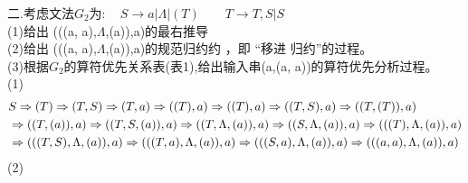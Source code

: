 \documentclass{article}
\begin{document}
\noindent
二.考虑文法$G_{2}为:\quad S \rightarrow a|\Lambda |(T)  \qquad T \rightarrow T,S|S $\\
(1)给出 (((a, a),$\Lambda$,(a)),a)的最右推导\\
(2)给出 (((a, a),$\Lambda$,(a)),a)的规范归约约 ，即 “移进 归约”的过程。\\
(3)根据$G_{2}$的算符优先关系表(表1),给出输入串(a,(a, a))的算符优先分析过程。\\
(1)\vspace{-1cm}
\begin{align*}
    \setlength{\abovedisplayskip}{0pt}
    \setlength{\belowdisplayskip}{3pt}
     & S \Rightarrow (T) \Rightarrow (T,S) \Rightarrow (T,a) \Rightarrow ((T),a) \Rightarrow ((T),a) \Rightarrow ((T,S),a) \Rightarrow ((T,(T)),a)        \\
     & \Rightarrow ((T,(a)),a) \Rightarrow ((T,S,(a)),a) \Rightarrow ((T,\Lambda,(a)),a)\Rightarrow ((S,\Lambda,(a)),a) \Rightarrow (((T),\Lambda,(a)),a) \\
     & \Rightarrow (((T,S),\Lambda,(a)),a) \Rightarrow (((T,a),\Lambda,(a)),a) \Rightarrow (((S,a),\Lambda,(a)),a) \Rightarrow (((a,a),\Lambda,(a)),a)
\end{align*}
\vspace{-1cm}
\noindent
(2)
\end{document}
